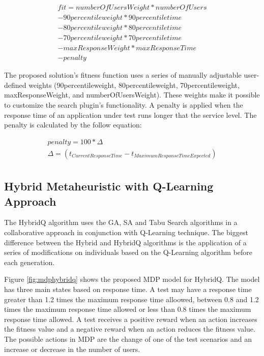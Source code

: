\documentclass{bmcart}
\begin{document}
\begin{equation}
\begin{aligned}
fit=numberOfUsersWeight*numberOfUsers\\
-90percentileweight* 90percentiletime\\
-80percentileweight*80percentiletime\\
-70percentileweight*70percentiletime\\
-maxResponseWeight*maxResponseTime\\
-penalty
\end{aligned}
\end{equation}

The proposed solution's fitness function uses a series of manually adjustable user-defined weights (90percentileweight, 80percentileweight,  70percentileweight, maxResponseWeight, and numberOfUsersWeight). These weights make it possible to customize the search plugin's functionality. A penalty is applied when the response time of an application under test runs longer that the service level. The penalty is calculated by the follow equation:

\begin{equation}
\begin{aligned}
penalty=100 * \Delta \\
\Delta=(t_{Current Response Time} - t_{Maximum Response Time Expected})\\
\end{aligned}
\end{equation}

\subsection{Hybrid Metaheuristic with Q-Learning Approach}

The HybridQ algorithm uses the GA, SA and Tabu Search algorithms in a collaborative approach in conjunction with Q-Learning technique. The biggest difference between the Hybrid and HybridQ algorithms is the application of a series of modifications on individuals based on the Q-Learning algorithm before each generation.

Figure \ref{fig:mdphybridq} shows the proposed MDP model for HybridQ. The model has three main states based on response time. A test may have a response time greater than 1.2 times the maximum response time alloowed, between 0.8 and 1.2 times the maximum response time allowed or less than 0.8 times the maximum response time allowed. A test receives a positive reward when an action increases the fitness value and a negative reward when an action reduces the fitness value. The possible actions in MDP are the change of one of the test scenarios and an increase or decrease in the number of users.
\end{document}
